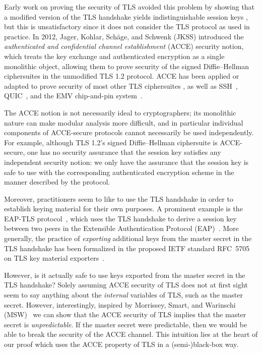 Early work on proving the security of TLS avoided this problem by showing that a modified version 
of the TLS handshake yields indistinguishable session keys \cite{JC:MorSmaWar10},
 but this is unsatisfactory since it does not consider the TLS protocol as used in practice.  
In 2012, Jager, Kohlar, Sch{\" a}ge, and Schwenk (JKSS) \cite{C:JKSS12} introduced the \emph{authenticated and confidential channel establishment} (ACCE) security notion, 
which treats the key exchange and authenticated encryption as a single monolithic object, 
allowing them to prove security of the signed Diffie--Hellman ciphersuites in the unmodified TLS 1.2 protocol.  
ACCE has been applied or adapted to prove security of most other TLS ciphersuites \cite{EPRINT:KohSchSch13,C:KraPatWee13,PKC:LSYKS14}, 
as well as SSH~\cite{CCS:BDKSS14}, 
QUIC~\cite{SP:LJBN15,CCS:FisGue14},
and the EMV chip-and-pin system~\cite{CCS:BSWW13}.

The ACCE notion is not necessarily ideal to cryptographers; 
its monolithic nature can make modular analysis more difficult, 
and in particular individual components of ACCE-secure protocols cannot necessarily be used independently.  
For example, 
although TLS 1.2's signed Diffie--Hellman ciphersuite is ACCE-secure, 
one has no security assurance that the session key satisfies any independent security notion: 
we only have the assurance that the session key is safe to use with the corresponding authenticated encryption scheme in the manner described by the protocol.

Moreover, practitioners seem to like to use the TLS handshake in order to establish keying material for their own purposes.  
A prominent example is the EAP-TLS protocol~\cite{IETF:2008:RFC5216-EAP-TLS},
which uses the TLS handshake to derive a session key between two peers in the Extensible Authentication Protocol (EAP)~\cite{IETF:RFC3748:EAP}.
More generally, the practice of \emph{exporting} additional keys from the master secret in the TLS handshake has been formalized in the proposed IETF standard RFC~5705 on TLS key material exporters~\cite{IETF:RFC:5705:TLS-key-exporters}.

However, 
is it actually safe to use keys exported from the master secret in the TLS handshake? 
Solely assuming ACCE security of TLS does not at first sight seem to say anything about the \emph{internal} variables of TLS,
such as the master secret. 
However, interestingly, 
inspired by Morrissey, Smart, and Warinschi (MSW)~\cite{JC:MorSmaWar10} we can show that the
ACCE security of TLS implies that the master secret is \emph{unpredictable}. 
If the master secret were predictable, then we would be able to break the security of the ACCE channel. 
This intuition lies at the heart of our proof which uses the ACCE property of TLS in a (semi-)black-box way.

